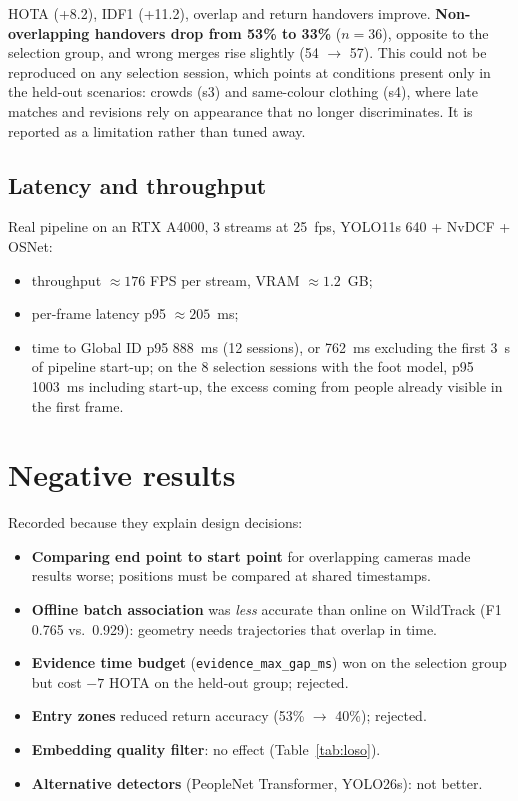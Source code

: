 \documentclass[11pt,a4paper]{article}
\begin{document}
HOTA (+8.2), IDF1 (+11.2), overlap and return handovers improve. \textbf{Non-overlapping
handovers drop from 53\% to 33\%} ($n=36$), opposite to the selection group, and wrong merges
rise slightly (54 $\to$ 57). This could not be reproduced on any selection session, which
points at conditions present only in the held-out scenarios: crowds (s3) and same-colour
clothing (s4), where late matches and revisions rely on appearance that no longer
discriminates. It is reported as a limitation rather than tuned away.

\subsection{Latency and throughput}
Real pipeline on an RTX A4000, 3 streams at 25~fps, YOLO11s 640 + NvDCF + OSNet:
\begin{itemize}
  \item throughput $\approx 176$ FPS per stream, VRAM $\approx 1.2$~GB;
  \item per-frame latency p95 $\approx 205$~ms;
  \item time to Global ID p95 888~ms (12 sessions), or 762~ms excluding the first 3~s of
        pipeline start-up; on the 8 selection sessions with the foot model, p95 1003~ms
        including start-up, the excess coming from people already visible in the first frame.
\end{itemize}

\section{Negative results}
Recorded because they explain design decisions:
\begin{itemize}
  \item \textbf{Comparing end point to start point} for overlapping cameras made results worse;
        positions must be compared at shared timestamps.
  \item \textbf{Offline batch association} was \emph{less} accurate than online on WildTrack
        (F1 0.765 vs.\ 0.929): geometry needs trajectories that overlap in time.
  \item \textbf{Evidence time budget} (\texttt{evidence\_max\_gap\_ms}) won on the selection group
        but cost $-7$ HOTA on the held-out group; rejected.
  \item \textbf{Entry zones} reduced return accuracy (53\% $\to$ 40\%); rejected.
  \item \textbf{Embedding quality filter}: no effect (Table~\ref{tab:loso}).
  \item \textbf{Alternative detectors} (PeopleNet Transformer, YOLO26s): not better.
\end{itemize}
\end{document}
